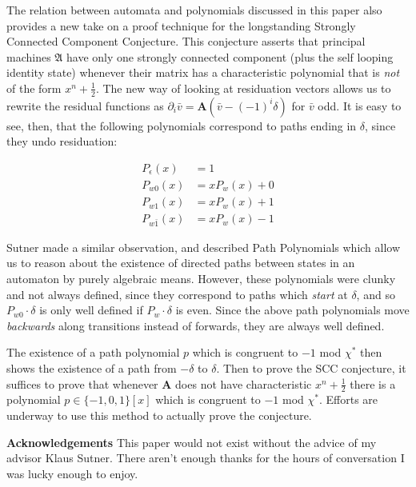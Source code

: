 \documentclass[runningheads]{llncs}
\renewcommand{\P}{\mathfrak{A}}
\newcommand{\2}{\textbf{2}}
\newcommand{\Am}{\textbf{A}}
\newcommand{\del}{\partial}
\newcommand{\vv}{\bar{v}}
\begin{document}
The relation between automata and polynomials discussed in this paper 
also provides a new take on a proof technique for the longstanding
Strongly Connected Component Conjecture. This conjecture 
asserts that principal machines $\P$ have only one strongly connected component 
(plus the self looping identity state) whenever their matrix has a 
characteristic polynomial that is \emph{not} of the form $x^n + \frac{1}{2}$.
The new way of looking at residuation vectors allows us to rewrite the 
residual functions as $\del_i \vv = \Am (\vv - (-1)^i \delta)$ for $\vv$ odd.
It is easy to see, then, that the following polynomials correspond to paths
ending in $\delta$, since they undo residuation:

\begin{align*}
  P_\epsilon(x)   &= 1\\
  P_{w0}(x)       &= xP_w(x) + 0\\
  P_{w1}(x)       &= xP_w(x) + 1\\
  P_{w\bar{1}}(x) &= xP_w(x) - 1
\end{align*}

Sutner made a similar observation, and described Path Polynomials 
\cite{Sutner18:abelian_automata} which
allow us to reason about the existence of directed paths between states 
in an automaton by purely algebraic means. However, these polynomials were
clunky and not always defined, since they correspond to paths which 
\emph{start} at $\delta$, and so $P_{w0} \cdot \delta$ is only well defined if 
$P_w \cdot \delta$ is even. Since the above path polynomials move
\emph{backwards} along transitions instead of forwards, they are always 
well defined.

The existence of a path polynomial $p$ which is congruent to $-1$ mod $\chi^*$
then shows the existence of a path from $-\delta$ to $\delta$.
Then to prove the SCC conjecture, it suffices to prove that whenever $\Am$ 
does not have characteristic $x^n + \frac{1}{2}$ there is a polynomial 
$p \in \{-1,0,1\}[x]$ which is congruent to $-1$ mod $\chi^*$. 
Efforts are underway to use this method to actually prove the conjecture.

\textbf{Acknowledgements}
This paper would not exist without the advice of my advisor Klaus Sutner.
There aren't enough thanks for the hours of conversation I was lucky enough
to enjoy.

\newpage



\end{document}
